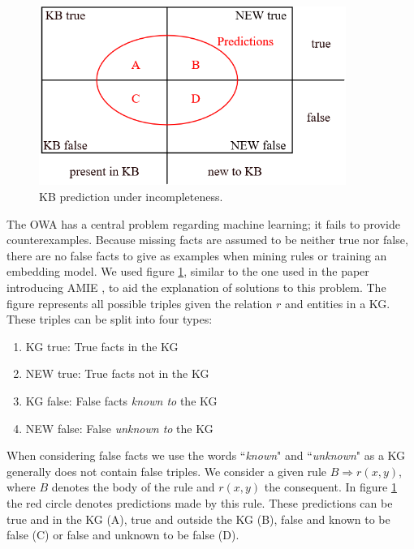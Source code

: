 \begin{figure}[htp]
    \centering
    \includegraphics[width=10cm]{figures/kb_venn.png}
    \caption{KB prediction under incompleteness.}
    \label{KB_predictions}
\end{figure}

The OWA has a central problem regarding machine learning; it fails to provide counterexamples. Because missing facts are assumed to be neither true nor false, there are no false facts to give as examples when mining rules or training an embedding model. We used figure \ref{KB_predictions}, similar to the one used in the paper introducing AMIE \cite{amie}, to aid the explanation of solutions to this problem. The figure represents all possible triples given the relation $r$ and entities in a KG. These triples can be split into four types:
\begin{enumerate}
    \item KG true: True facts in the KG
    \item NEW true: True facts not in the KG
    \item KG false: False facts \textit{known to} the KG
    \item NEW false: False \textit{unknown to} the KG
\end{enumerate}
When considering false facts we use the words ``\textit{known}" and ``\textit{unknown}" as a KG generally does not contain false triples. We consider a given rule $B \Rightarrow r(x, y)$, where $B$ denotes the body of the rule and $r(x, y)$ the consequent. In figure \ref{KB_predictions} the red circle denotes predictions made by this rule. These predictions can be true and in the KG (A), true and outside the KG (B), false and known to be false (C) or false and unknown to be false (D). 

